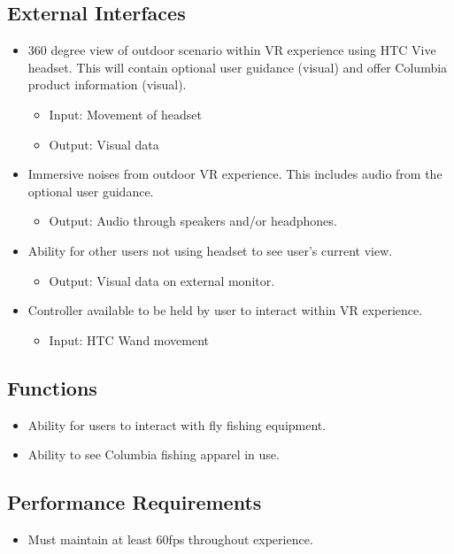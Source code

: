 \documentclass[10pt,journal,compsoc,onecolumn, draftclsnofoot]{IEEEtran}
\begin{document}
\begin{bibunit}
\subsection{External Interfaces}
\begin{itemize}
  \item 360 degree view of outdoor scenario within VR experience using HTC Vive
  headset. This will contain optional user guidance (visual) and offer Columbia
  product information (visual).
    \begin{itemize}
      \item Input: Movement of headset
      \item Output: Visual data
    \end{itemize}
  \item Immersive noises from outdoor VR experience. This includes audio from
  the optional user guidance.
    \begin{itemize}
      \item Output: Audio through speakers and/or headphones.
    \end{itemize}
  \item Ability for other users not using headset to see user's current view.
    \begin{itemize}
      \item Output: Visual data on external monitor.
    \end{itemize}
  \item Controller available to be held by user to interact within VR experience.
    \begin{itemize}
      \item Input: HTC Wand movement
    \end{itemize}
\end{itemize}

\subsection{Functions}
\begin{itemize}
  \item Ability for users to interact with fly fishing equipment.
  \item Ability to see Columbia fishing apparel in use.
\end{itemize}

\subsection{Performance Requirements}
\begin{itemize}
  \item Must maintain at least 60fps throughout experience.\cite{hall_2016}
\end{itemize}


\end{bibunit}
\end{document}
